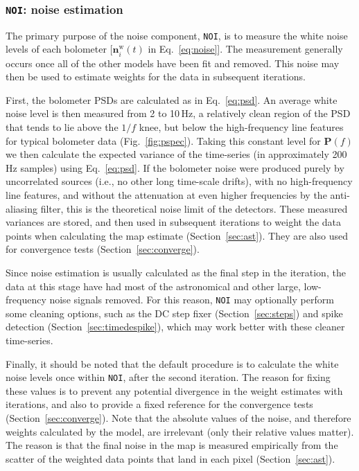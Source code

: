 \documentclass[useAMS,usenatbib,nofootinbib]{mn2e}
\newcommand{\model}[1]{\texttt{#1}}
\begin{document}
\subsubsection{\model{NOI}: noise estimation}
\label{sec:noi}

The primary purpose of the noise component, \model{NOI}, is to measure
the white noise levels of each bolometer [$\mathbf{n}^\mathrm{w}_i(t)$
in Eq.~\ref{eq:noise}]. The measurement generally occurs once all of
the other models have been fit and removed. This noise may then be
used to estimate weights for the data in subsequent iterations.

First, the bolometer PSDs are calculated as in Eq.~\ref{eq:psd}. An
average white noise level is then measured from 2 to 10\,Hz, a
relatively clean region of the PSD that tends to lie above the $1/f$
knee, but below the high-frequency line features for typical bolometer
data (Fig.~\ref{fig:pspec}). Taking this constant level for
$\mathbf{P}(f)$ we then calculate the expected variance of the
time-series (in approximately 200\,Hz samples) using
Eq.~\ref{eq:psd}. If the bolometer noise were produced purely by
uncorrelated sources (i.e., no other long time-scale drifts), with no
high-frequency line features, and without the attenuation at even
higher frequencies by the anti-aliasing filter, this is the
theoretical noise limit of the detectors. These measured variances are
stored, and then used in subsequent iterations to weight the data
points when calculating the map estimate (Section~\ref{sec:ast}). They
are also used for convergence tests (Section~\ref{sec:converge}).

Since noise estimation is usually calculated as the final step in the
iteration, the data at this stage have had most of the astronomical
and other large, low-frequency noise signals removed. For this reason,
\model{NOI} may optionally perform some cleaning options, such as the
DC step fixer (Section~\ref{sec:steps}) and spike detection
(Section~\ref{sec:timedespike}), which may work better with these
cleaner time-series.

Finally, it should be noted that the default procedure is to calculate
the white noise levels once within \model{NOI}, after the second
iteration. The reason for fixing these values is to prevent any
potential divergence in the weight estimates with iterations, and also
to provide a fixed reference for the convergence tests
(Section~\ref{sec:converge}). Note that the absolute values of the
noise, and therefore weights calculated by the model, are irrelevant
(only their relative values matter). The reason is that the final
noise in the map is measured empirically from the scatter of the
weighted data points that land in each pixel (Section~\ref{sec:ast}).
\end{document}
